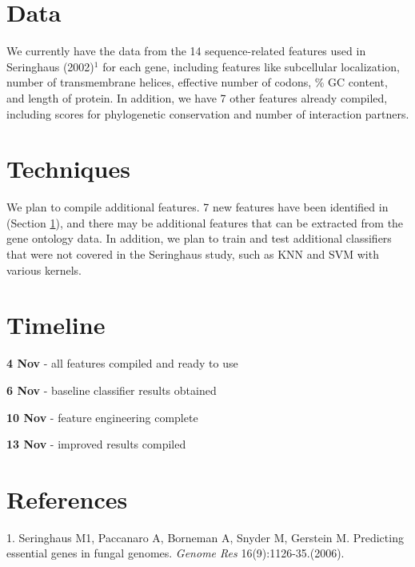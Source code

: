 \documentclass{article}
\begin{document}
\section{Data} \label{Data}

We currently have the data from the 14 sequence-related features used in Seringhaus (2002)$^1$ for each gene, including features like subcellular localization, number of transmembrane helices, effective number of codons, \% GC content, and length of protein. In addition, we have 7 other features already compiled, including scores for phylogenetic conservation and number of interaction partners. 


\section{Techniques}
We plan to compile additional features.  7 new features have been identified in (Section \ref{Data}), and there may be additional features that can be extracted from the gene ontology data.  In addition, we plan to train and test additional classifiers that were not covered in the Seringhaus study, such as KNN and SVM with various kernels.

\section{Timeline}
\begin{multicols}{2}

\noindent
\textbf{4 Nov} - all features compiled and ready to use

\noindent
\textbf{6 Nov} - baseline classifier results obtained

\noindent
\textbf{10 Nov} - feature engineering complete

\noindent
\textbf{13 Nov} - improved results compiled
\end{multicols}

\section{References}
1. Seringhaus M1, Paccanaro A, Borneman A, Snyder M, Gerstein M. Predicting essential genes in fungal genomes. \textit{Genome Res} 16(9):1126-35.(2006).
\end{document}
